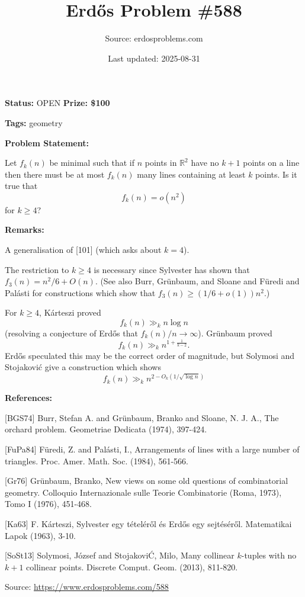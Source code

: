 \documentclass{article}
\title{Erd\H{o}s Problem \#588}
\date{Last updated: 2025-08-31}
\author{Source: erdosproblems.com}
\begin{document}
\maketitle

\noindent\textbf{Status:} OPEN \quad \textbf{Prize: \$100}

\noindent\textbf{Tags:} geometry

\medskip
\noindent\textbf{Problem Statement:}

Let $f_k(n)$ be minimal such that if $n$ points in $\mathbb{R}^2$ have no $k+1$ points on a line then there must be at most $f_k(n)$ many lines containing at least $k$ points. Is it true that\[f_k(n)=o(n^2)\]for $k\geq 4$?

\bigskip
\noindent\textbf{Remarks:}

A generalisation of [101] (which asks about $k=4$). 

The restriction to $k\geq 4$ is necessary since Sylvester has shown that $f_3(n)= n^2/6+O(n)$. (See also Burr, Gr\"{u}nbaum, and Sloane \cite{BGS74} and F\"{u}redi and Pal\'{a}sti \cite{FuPa84} for constructions which show that $f_3(n)\geq(1/6+o(1))n^2$.)

For $k\geq 4$, K\'{a}rteszi \cite{Ka63} proved\[f_k(n)\gg_k n\log n\](resolving a conjecture of Erd\H{o}s that $f_k(n)/n\to \infty$). Gr\"{u}nbaum \cite{Gr76} proved\[f_k(n) \gg_k n^{1+\frac{1}{k-2}}.\]Erd\H{o}s speculated this may be the correct order of magnitude, but Solymosi and Stojakovi\'{c} \cite{SoSt13} give a construction which shows\[f_k(n)\gg_k n^{2-O_k(1/\sqrt{\log n})}\]

\bigskip
\noindent\textbf{References:}

[BGS74] Burr, Stefan A. and Gr\"{u}nbaum, Branko and Sloane, N. J. A., The orchard problem. Geometriae Dedicata (1974), 397-424.
 
 [FuPa84] F\"{u}redi, Z. and Pal\'{a}sti, I., Arrangements of lines with a large number of triangles. Proc. Amer. Math. Soc. (1984), 561-566.
 
 [Gr76] Gr\"{u}nbaum, Branko, New views on some old questions of combinatorial geometry. Colloquio Internazionale sulle Teorie Combinatorie
(Roma, 1973), Tomo I (1976), 451-468.
 
 [Ka63] F. K\'{a}rteszi, Sylvester egy t\'{e}tel\'{e}r\H{o}l \'{e}s Erd\H{o}s egy sejt\'{e}s\'{e}r\H{o}l. Matematikai Lapok (1963), 3-10.
 
 [SoSt13] Solymosi, J\'{o}zsef and Stojakovi\'C, Milo\vS, Many collinear {$k$}-tuples with no {$k+1$} collinear points. Discrete Comput. Geom. (2013), 811-820.

\bigskip
\noindent\small{Source: \url{https://www.erdosproblems.com/588}}
\end{document}
